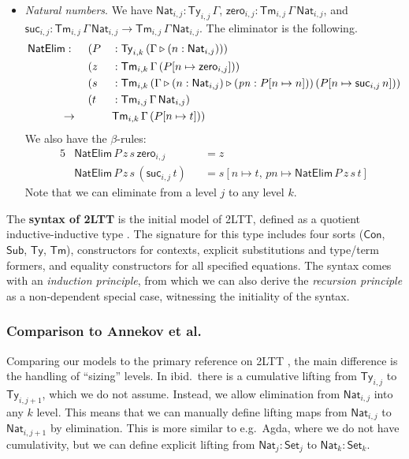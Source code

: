 \documentclass[acmsmall,review]{acmart}
\newcommand{\mit}[1]{\mathit{#1}}
\newcommand{\msf}[1]{\mathsf{#1}}
\newcommand{\ext}{\triangleright}
\newcommand{\NatElim}{\msf{NatElim}}
\newcommand{\Con}{\msf{Con}}
\newcommand{\Sub}{\msf{Sub}}
\newcommand{\Ty}{\msf{Ty}}
\newcommand{\Tm}{\msf{Tm}}
\newcommand{\Nat}{\msf{Nat}}
\newcommand{\zero}{\msf{zero}}
\newcommand{\suc}{\msf{suc}}
\newcommand{\Set}{\mathsf{Set}}
\theoremstyle{remark}
\begin{document}
\begin{definition}
\begin{itemize}
\item \emph{Natural numbers}. We have $\Nat_{i,j} : \Ty_{i,j}\,\Gamma$, $\zero_{i,j} : \Tm_{i,j}\,\Gamma\,\Nat_{i,j}$,
  and $\suc_{i,j} : \Tm_{i,j}\,\Gamma\,\Nat_{i,j} \to \Tm_{i,j}\,\Gamma\,\Nat_{i,j}$. The eliminator is the following.
  \begin{alignat*}{5}
    & \NatElim :\hspace{0.5em}
                &&  (P &&: \Ty_{i,k}\,(\Gamma \ext (n : \Nat_{i,j}))) \\
    &           &&  (z &&: \Tm_{i,k}\,\Gamma\,(P[n\mapsto \zero_{i,j}])) \\
    &           &&  (s &&: \Tm_{i,k}\,(\Gamma \ext (n : \Nat_{i,j}) \ext (\mit{pn} : P[n\mapsto n]))\,(P[n\mapsto \suc_{i,j}\,n]))\\
    &           &&  (t &&: \Tm_{i,j}\,\Gamma\,\Nat_{i,j}) \\
    &\hspace{3em}\to        &&&& \Tm_{i,k}\,\Gamma\,(P[n\mapsto t]))
  \end{alignat*}
  We also have the $\beta$-rules:
  \begin{alignat*}{5}
    & \NatElim\,P\,z\,s\,\zero_{i,j}     &&= z \\
    & \NatElim\,P\,z\,s\,(\suc_{i,j}\,t) &&= s[n \mapsto t,\,\mit{pn} \mapsto \NatElim\,P\,z\,s\,t]
  \end{alignat*}
  Note that we can eliminate from a level $j$ to any level $k$.
\end{itemize}
\end{definition}

\begin{definition}
The \textbf{syntax of 2LTT} is the initial model of 2LTT, defined as a quotient
inductive-inductive type \cite{kaposi2019constructing}. The signature for this
type includes four sorts ($\Con$, $\Sub$, $\Ty$, $\Tm$), constructors for
contexts, explicit substitutions and type/term formers, and equality
constructors for all specified equations. The syntax comes with an
\emph{induction principle}, from which we can also derive the \emph{recursion principle} as a
non-dependent special case, witnessing the initiality of the syntax.
\end{definition}

\subsubsection{Comparison to Annekov et al.}
Comparing our models to the primary reference on 2LTT \cite{twolevel}, the main
difference is the handling of ``sizing'' levels. In ibid.\ there is a cumulative
lifting from $\Ty_{i,j}$ to $\Ty_{i,j+1}$, which we do not assume. Instead,
we allow elimination from $\Nat_{i,j}$ into any $k$ level. This means that we
can manually define lifting maps from $\Nat_{i,j}$ to $\Nat_{i,j+1}$ by
elimination. This is more similar to e.g.\ Agda, where we do not have cumulativity,
but we can define explicit lifting from $\Nat_j : \Set_j$ to $\Nat_k : \Set_k$.
\end{document}
